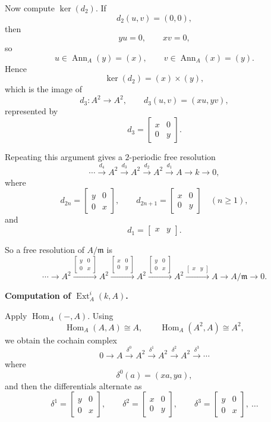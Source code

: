 \documentclass[12pt,a4paper,oneside]{report}
\theoremstyle{notespace}
\begin{document}
Now compute \(\ker(d_2)\). If
\[
d_2(u,v)=(0,0),
\]
then
\[
yu=0,\qquad xv=0,
\]
so
\[
u\in \operatorname{Ann}_A(y)=(x),
\qquad
v\in \operatorname{Ann}_A(x)=(y).
\]
Hence
\[
\ker(d_2)=(x)\times (y),
\]
which is the image of
\[
d_3:A^2\to A^2,
\qquad
d_3(u,v)=(xu,yv),
\]
represented by
\[
d_3=
\begin{bmatrix}
	x&0\\
	0&y
\end{bmatrix}.
\]

Repeating this argument gives a \(2\)-periodic free resolution
\[
\cdots \xrightarrow{d_4} A^2 \xrightarrow{d_3} A^2 \xrightarrow{d_2} A^2 \xrightarrow{d_1} A \to k \to 0,
\]
where
\[
d_{2n}=
\begin{bmatrix}
	y&0\\
	0&x
\end{bmatrix},
\qquad
d_{2n+1}=
\begin{bmatrix}
	x&0\\
	0&y
\end{bmatrix}
\quad (n\ge 1),
\]
and
\[
d_1=\begin{bmatrix}x&y\end{bmatrix}.
\]

So a free resolution of \(A/\mathfrak m\) is
\[
\cdots \to A^2
\xrightarrow{\left[\begin{smallmatrix}y&0\\0&x\end{smallmatrix}\right]}
A^2
\xrightarrow{\left[\begin{smallmatrix}x&0\\0&y\end{smallmatrix}\right]}
A^2
\xrightarrow{\left[\begin{smallmatrix}y&0\\0&x\end{smallmatrix}\right]}
A^2
\xrightarrow{\left[\begin{smallmatrix}x&y\end{smallmatrix}\right]}
A
\to A/\mathfrak m \to 0.
\]

\medskip

\textbf{Computation of \(\operatorname{Ext}_A^i(k,A)\).}

Apply \(\operatorname{Hom}_A(-,A)\). Using
\[
\operatorname{Hom}_A(A,A)\cong A,\qquad \operatorname{Hom}_A(A^2,A)\cong A^2,
\]
we obtain the cochain complex
\[
0\to A \xrightarrow{\delta^0} A^2 \xrightarrow{\delta^1} A^2 \xrightarrow{\delta^2} A^2 \xrightarrow{\delta^3}\cdots
\]
where
\[
\delta^0(a)=(xa,ya),
\]
and then the differentials alternate as
\[
\delta^1=
\begin{bmatrix}
	y&0\\
	0&x
\end{bmatrix},
\qquad
\delta^2=
\begin{bmatrix}
	x&0\\
	0&y
\end{bmatrix},
\qquad
\delta^3=
\begin{bmatrix}
	y&0\\
	0&x
\end{bmatrix},
\ \dots
\]
\end{document}
